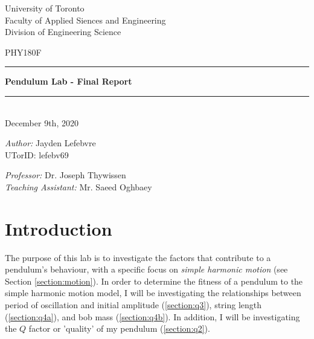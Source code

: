 \documentclass[12pt]{article}
\begin{document}
\doublespacing

\begin{titlepage}
    \begin{center}
        {\large \sc University of Toronto} \\
        {\large \sc Faculty of Applied Siences and Engineering}\\[0.7cm]
        {\small \sc Division of Engineering Science}
        
        \vspace{4cm}
        
        {\large \sc PHY180F}\\
        \rule{\linewidth}{2pt}
        
        \vspace{0.9em} %
        {\Large \bfseries Pendulum Lab - Final Report}
        \vspace{0.2em} %
        
        \rule{\linewidth}{2pt} \\
        {\small \sc December 9th, 2020}
    \end{center}
    
    \vspace{4cm}
    
    \begin{minipage}{0.43\textwidth}
        \emph{Author:}
        Jayden Lefebvre\\
        UTorID:
        lefebv69
    \end{minipage}
    \hspace{1cm}
    \begin{minipage}{0.43\textwidth}
        \emph{Professor:}
        \hspace{1.5cm} Dr. Joseph Thywissen\\
        \emph{Teaching Assistant: }
        Mr. Saeed Oghbaey
    \end{minipage}
    
    \vfill
\end{titlepage}


\pagestyle{empty}
\tableofcontents
\newpage
\setcounter{page}{1}
\pagestyle{plain}
\singlespacing
\section{Introduction}
\label{section:intro}
The purpose of this lab is to investigate the factors that contribute to a pendulum's behaviour, with a specific focus on \emph{simple harmonic motion} (see Section \ref{section:motion}).
In order to determine the fitness of a pendulum to the simple harmonic motion model, I will be investigating the relationships between period of oscillation and initial amplitude (\ref{section:q3}), string length (\ref{section:q4a}), and bob mass (\ref{section:q4b}). 
In addition, I will be investigating the $Q$ factor or 'quality' of my pendulum (\ref{section:q2}).
\end{document}
